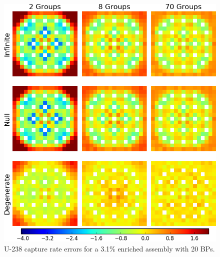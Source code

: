 \begin{figure}[h!]
\centering
\includegraphics[width=\linewidth]{figures/quantification/assm-31-20BPs/capt-err}
\caption[U-238 capture rate errors for a 3.1\% enriched assembly with 20 BPs]{U-238 capture rate errors for a 3.1\% enriched assembly with 20 BPs.}
\label{fig:chap8-assm-3.1-20BPs-capt-err}
\end{figure}


